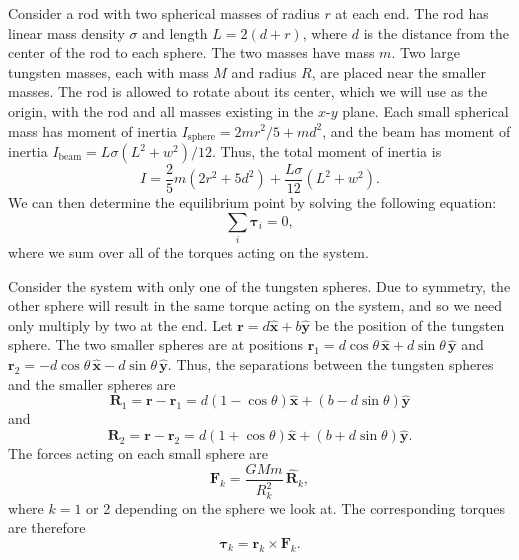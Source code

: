 \documentclass[aps, reprint,amsmath,amssymb]{revtex4-1} %
\renewcommand{\vec}[1]{\boldsymbol{#1}}
\newcommand{\uv}[1]{\vec{\hat{#1}}}
\newcommand{\x}{\vec{\hat{x}}}
\newcommand{\y}{\vec{\hat{y}}}
\begin{document}
Consider a rod with two spherical masses of radius $r$ at each end.  The
rod has linear mass density $\sigma$ and length $L=2(d + r)$, where $d$ is
the distance from the center of the rod to each sphere. The two masses have
mass $m$. Two large tungsten masses, each with mass $M$ and radius $R$, are
placed near the smaller masses. The rod is allowed to rotate about its
center, which we will use as the origin, with the rod and all masses
existing in the $x$-$y$ plane. Each small spherical mass has moment of
inertia $I_\text{sphere} = 2mr^2/5 + md^2$, and the beam has moment of
inertia $I_\text{beam} = L\sigma(L^2 + w^2)/12$. Thus, the total moment
of inertia is
\begin{equation}
    \label{eq:moment_of_inertia}
    I = \frac{2}{5} m (2 r^2 + 5 d^2) + \frac{L\sigma}{12}(L^2 + w^2).
\end{equation}
We can then determine the equilibrium point by solving the following
equation:
\begin{equation}
    \sum_i \vec{\tau}_i = 0,
\end{equation}
where we sum over all of the torques acting on the system. 

Consider the system with only one of the tungsten spheres. Due to symmetry,
the other sphere will result in the same torque acting on the system, and
so we need only multiply by two at the end. Let $\vec{r} = d\x + b\y$ be the
position of the tungsten sphere. The two smaller spheres are at positions
$\vec{r}_1 = d \cos\theta\,\x + d \sin \theta \, \y$ and $\vec{r}_2 = -d
\cos \theta\,\x - d \sin \theta \, \y$. Thus, the separations between the
tungsten spheres and the smaller spheres are
\[
    \vec{R}_1 = \vec{r} - \vec{r}_1 = d(1 - \cos\theta)\x + (b -
    d\sin\theta) \y
\]
and
\[
    \vec{R}_2 = \vec{r} - \vec{r}_2 = d(1 + \cos\theta)\x + (b + d \sin
    \theta) \y.
\]
The forces acting on each small sphere are
\begin{equation}
    \label{eq:forces}
    \vec{F}_k = \frac{G M m}{R_k^2}\,\uv{R}_k,
\end{equation}
where $k = 1$ or 2 depending on the sphere we look at. The corresponding
torques are therefore
\begin{equation}
    \label{eq:torques}
    \vec{\tau}_k = \vec{r}_k \times \vec{F}_k.
\end{equation}
\end{document}
